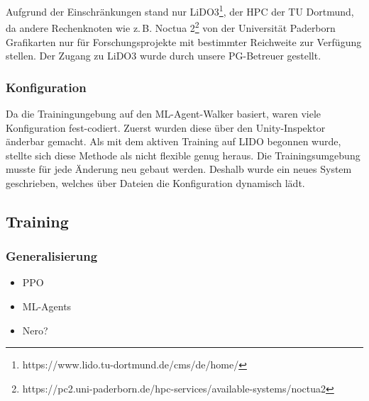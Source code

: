 Aufgrund der Einschränkungen stand nur LiDO3\footnote{https://www.lido.tu-dortmund.de/cms/de/home/}, der HPC der TU Dortmund, da andere Rechenknoten wie z.\,B. Noctua 2\footnote{https://pc2.uni-paderborn.de/hpc-services/available-systems/noctua2} von der Universität Paderborn Grafikarten nur für Forschungsprojekte mit bestimmter Reichweite zur Verfügung stellen. Der Zugang zu LiDO3 wurde durch unsere PG-Betreuer gestellt.
\subsubsection{Konfiguration}
Da die Trainingungebung auf den ML-Agent-Walker basiert, waren viele Konfiguration fest-codiert. Zuerst wurden diese über den Unity-Inspektor änderbar gemacht. Als mit dem aktiven Training auf LIDO begonnen wurde, stellte sich diese Methode als nicht flexible genug heraus. Die Trainingsumgebung musste für jede Änderung neu gebaut werden. Deshalb wurde ein neues System geschrieben, welches über Dateien die Konfiguration dynamisch lädt.

\subsection{Training}
\subsubsection{Generalisierung}
\begin{itemize}
	\item PPO
	\item ML-Agents
	\item Nero?
\end{itemize}
